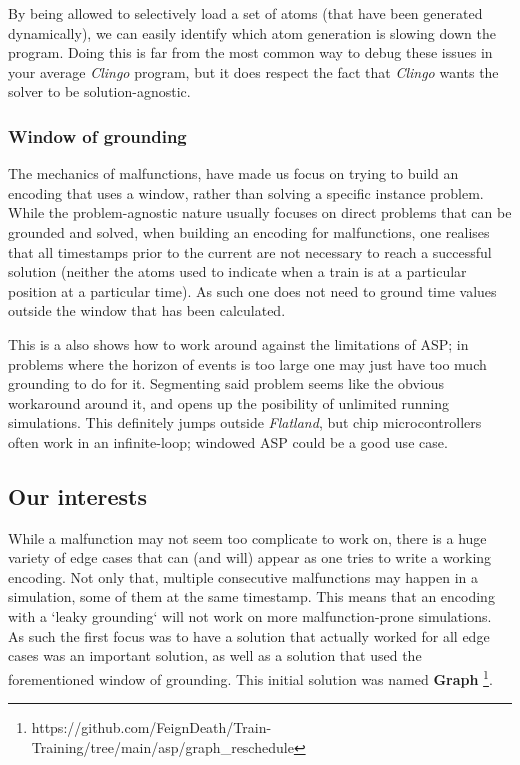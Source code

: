 By being allowed to selectively load a set of atoms (that have been generated dynamically), we can easily identify which atom generation is slowing down the program. Doing this is far from the most common way to debug these issues in your average \textit{Clingo} program, but it does respect the fact that \textit{Clingo} wants the solver to be solution-agnostic. 


\subsubsection{Window of grounding}
\label{sec:window}
The mechanics of malfunctions, have made us focus on trying to build an encoding that uses a window, rather than solving a specific instance problem. While the problem-agnostic nature usually focuses on direct problems that can be grounded and solved, when building an encoding for malfunctions, one realises that all timestamps prior to the current are not necessary to reach a successful solution (neither the atoms used to indicate when a train is at a particular position at a particular time). As such one does not need to ground time values outside the window that has been calculated.

This is a also shows how to work around against the limitations of ASP; in problems where the horizon of events is too large one may just have too much grounding to do for it. Segmenting said problem seems like the obvious workaround around it, and opens up the posibility of unlimited running simulations. This definitely jumps outside \textit{Flatland}, but chip microcontrollers often work in an infinite-loop; windowed ASP could be a good use case.
  

\subsection{Our interests}
While a malfunction may not seem too complicate to work on, there is a huge variety of edge cases that can (and will) appear as one tries to write a working encoding. Not only that, multiple consecutive malfunctions may happen in a simulation, some of them at the same timestamp. This means that an encoding with a `leaky grounding` will not work on more malfunction-prone simulations. As such the first focus was to have a solution that actually worked for all edge cases was an important solution, as well as a solution that used the forementioned window of grounding. This initial solution was named \textbf{Graph} \footnote{https://github.com/FeignDeath/Train-Training/tree/main/asp/graph\_reschedule}. 


